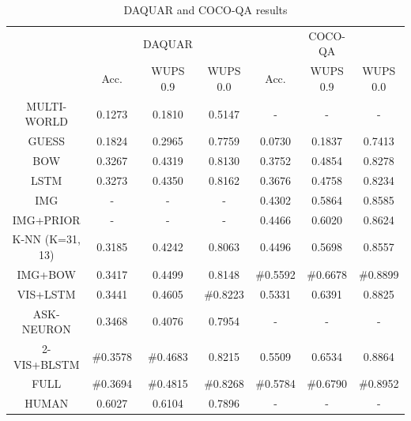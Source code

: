 \begin{table}[h]
\caption{DAQUAR and COCO-QA results}
\label{tab:daquar_results}
\begin{center}
\begin{small}
\begin{sc}
\begin{tabular}{c | c c c | c c c}
\hline     
                     &          &  DAQUAR  &          &          &  COCO-QA &          \\
                     & Acc.     & WUPS 0.9 & WUPS 0.0 & Acc.     & WUPS 0.9 & WUPS 0.0 \\
\hline         
MULTI-WORLD
\cite{malinowski14b} &  0.1273  &  0.1810  &  0.5147  &  -       &  -       &  -       \\
GUESS                &  0.1824  &  0.2965  &  0.7759  &  0.0730  &  0.1837  &  0.7413  \\
BOW                  &  0.3267  &  0.4319  &  0.8130  &  0.3752  &  0.4854  &  0.8278  \\
LSTM                 &  0.3273  &  0.4350  &  0.8162  &  0.3676  &  0.4758  &  0.8234  \\
IMG                  &  -       &  -       &  -       &  0.4302  &  0.5864  &  0.8585  \\
IMG+PRIOR            &  -       &  -       &  -       &  0.4466  &  0.6020  &  0.8624  \\
K-NN (K=31, 13)      &  0.3185  &  0.4242  &  0.8063  &  0.4496  &  0.5698  &  0.8557  \\
IMG+BOW              &  0.3417  &  0.4499  &  0.8148  &\#{0.5592}&\#{0.6678}&\#{0.8899}\\
VIS+LSTM             &  0.3441  &  0.4605  &\#{0.8223}&  0.5331  &  0.6391  & 0.8825   \\
ASK-NEURON
\cite{malinowski15}  &  0.3468  &  0.4076  & 0.7954   &  -       &  -       &  -       \\
2-VIS+BLSTM          &\#{0.3578}&\#{0.4683}& 0.8215   &  0.5509  &  0.6534  & 0.8864   \\
FULL                 &\#{0.3694}&\#{0.4815}&\#{0.8268}&\#{0.5784}&\#{0.6790}&\#{0.8952}\\
\hline
HUMAN                &  0.6027  &  0.6104  &  0.7896  &  -       &  -       &  -       \\
\hline
\end{tabular}
\end{sc}
\end{small}
\end{center}
\end{table}

